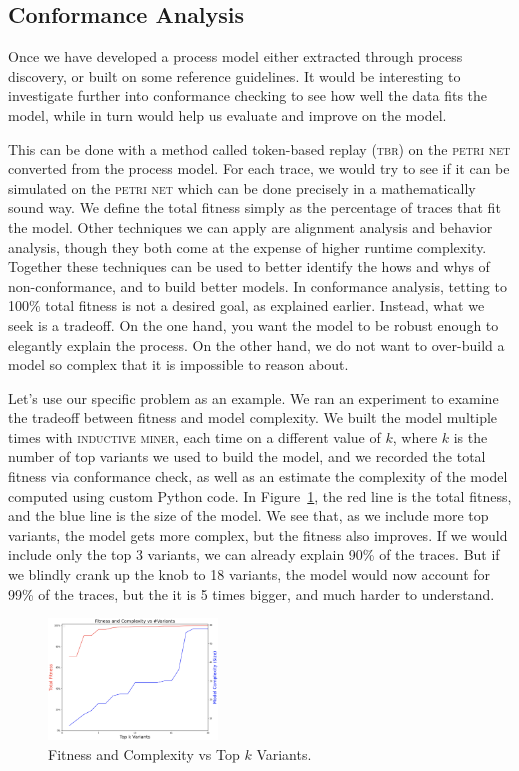 \documentclass[conference]{IEEEtran}
\begin{document}
\subsection{Conformance Analysis}

Once we have developed a process model either extracted through process
discovery, or built on some reference guidelines. It would be
interesting to investigate further into conformance checking to see how
well the data fits the model, while in turn would help us evaluate and
improve on the model.

This can be done with a method called token-based replay (\textsc{tbr}) on the
\textsc{petri net} converted from the process model. For each trace, we would try
to see if it can be simulated on the \textsc{petri net} which can be done
precisely in a mathematically sound
way. We define the total fitness
simply as the percentage of traces that fit the model. Other techniques
we can apply are 
alignment analysis and behavior analysis, though
they both come at the expense of higher runtime complexity.
Together these techniques can be used to better identify the hows and whys of
non-conformance, and to build better models.
In conformance analysis,
tetting to 100\% total fitness is not a desired goal, as explained earlier.
Instead, what we seek is a tradeoff. On the one hand, you want the model
to be robust enough to elegantly explain the process. On the other hand,
we do not want to over-build a model so complex that it is impossible to
reason about.

Let's use our specific problem as an example. We
ran an experiment to examine the tradeoff between fitness and model
complexity. We built the model multiple times with \textsc{inductive miner},
each time on a different value of $k$, where $k$ is the number of top
variants we
used to build the model, and we recorded the total fitness via conformance
check, as well as an estimate the complexity of the model computed using
custom Python code.
In Figure~\ref{fig-tradeoff}, the
red line is the total fitness, and the blue line is the size of the
model. We see that, as we include more top variants, the model gets more
complex, but the fitness also improves. If we would include only the top
3 variants, we can already explain 90\% of the traces. But if we blindly
crank up the knob to 
18 variants, the model would now account for 99\% of the traces, but the
it is 5 times bigger, and much harder to understand.

\begin{figure}[htbp]
\centerline{\includegraphics[width=0.40\textwidth]{images/tradeoff.png}}
\caption{Fitness and Complexity vs Top $k$ Variants.}
\label{fig-tradeoff}
\end{figure}
\end{document}
